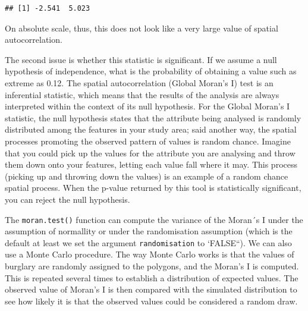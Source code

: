 \documentclass[
  krantz2]{krantz}
\makeatletter
\newenvironment{Shaded}{\begin{snugshade}}{\end{snugshade}}
\newcommand{\CommentTok}[1]{\textcolor[rgb]{0.37,0.37,0.37}{\textit{#1}}}
\newcommand{\ControlFlowTok}[1]{\textcolor[rgb]{0.27,0.27,0.27}{\textbf{#1}}}
\newcommand{\DecValTok}[1]{\textcolor[rgb]{0.06,0.06,0.06}{#1}}
\newcommand{\FunctionTok}[1]{\textcolor[rgb]{0,0,0}{#1}}
\newcommand{\NormalTok}[1]{#1}
\newcommand{\OtherTok}[1]{\textcolor[rgb]{0.37,0.37,0.37}{#1}}
\newcommand{\SpecialCharTok}[1]{\textcolor[rgb]{0,0,0}{#1}}
\newenvironment{kframe}{%
\medskip{}
\setlength{\fboxsep}{.8em}
 \def\at@end@of@kframe{}%
 \ifinner\ifhmode%
  \def\at@end@of@kframe{\end{minipage}}%
  \begin{minipage}{\columnwidth}%
 \fi\fi%
 \def\FrameCommand##1{\hskip\@totalleftmargin \hskip-\fboxsep
 \colorbox{shadecolor}{##1}\hskip-\fboxsep
     \hskip-\linewidth \hskip-\@totalleftmargin \hskip\columnwidth}%
 \MakeFramed {\advance\hsize-\width
   \@totalleftmargin\z@ \linewidth\hsize
   \@setminipage}}%
 {\par\unskip\endMakeFramed%
 \at@end@of@kframe}
\renewenvironment{Shaded}{\begin{kframe}}{\end{kframe}}
\makeatother
\begin{document}
\begin{Shaded}
\end{Shaded}

\begin{verbatim}
## [1] -2.541  5.023
\end{verbatim}

On absolute scale, thus, this does not look like a very large value of spatial autocorrelation.

The second issue is whether this statistic is significant. If we assume a null hypothesis of independence, what is the probability of obtaining a value such as extreme as 0.12. The spatial autocorrelation (Global Moran's I) test is an inferential statistic, which means that the results of the analysis are always interpreted within the context of its null hypothesis. For the Global Moran's I statistic, the null hypothesis states that the attribute being analysed is randomly distributed among the features in your study area; said another way, the spatial processes promoting the observed pattern of values is random chance. Imagine that you could pick up the values for the attribute you are analysing and throw them down onto your features, letting each value fall where it may. This process (picking up and throwing down the values) is an example of a random chance spatial process. When the p-value returned by this tool is statistically significant, you can reject the null hypothesis.

The \texttt{moran.test()} function can compute the variance of the Moran´s I under the assumption of normallity or under the randomisation assumption (which is the default at least we set the argument \texttt{randomisation} to `FALSE``). We can also use a Monte Carlo procedure. The way Monte Carlo works is that the values of burglary are randomly assigned to the polygons, and the Moran's I is computed. This is repeated several times to establish a distribution of expected values. The observed value of Moran's I is then compared with the simulated distribution to see how likely it is that the observed values could be considered a random draw.
\end{document}
